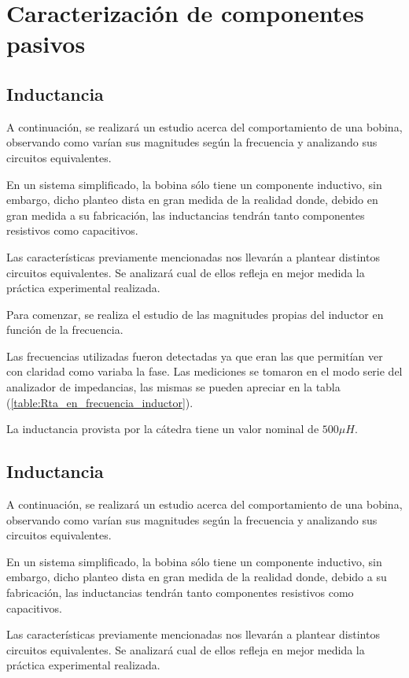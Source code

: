 \section{Caracterización de componentes pasivos}


\subsection{Inductancia}
A continuación, se realizará un estudio acerca del comportamiento de una bobina, observando como varían sus magnitudes según la frecuencia y analizando sus circuitos equivalentes.\par En un sistema simplificado, la bobina sólo tiene un componente inductivo, sin embargo, dicho planteo dista en gran medida de la realidad donde, debido en gran medida a su fabricación, las inductancias tendrán tanto componentes resistivos como capacitivos. \par Las características previamente mencionadas nos llevarán a plantear distintos circuitos equivalentes. Se analizará cual de ellos refleja en mejor medida la práctica experimental realizada.

Para comenzar, se realiza el estudio de las magnitudes propias del inductor en función de la frecuencia. \par Las frecuencias utilizadas fueron detectadas ya que eran las que permitían ver con claridad como variaba la fase. Las mediciones se tomaron en el modo serie del analizador de impedancias, las mismas se pueden apreciar en la tabla (\ref{table:Rta_en_frecuencia_inductor}).

La inductancia provista por la cátedra tiene un valor nominal de $500\mu H$.
\par\par

\subsection*{Inductancia}
A continuación, se realizará un estudio acerca del comportamiento de una bobina, observando como varían sus magnitudes según la frecuencia y analizando sus circuitos equivalentes.\par En un sistema simplificado, la bobina sólo tiene un componente inductivo, sin embargo, dicho planteo dista en gran medida de la realidad donde, debido a su fabricación, las inductancias tendrán tanto componentes resistivos como capacitivos. \par Las características previamente mencionadas nos llevarán a plantear distintos circuitos equivalentes. Se analizará cual de ellos refleja en mejor medida la práctica experimental realizada.

